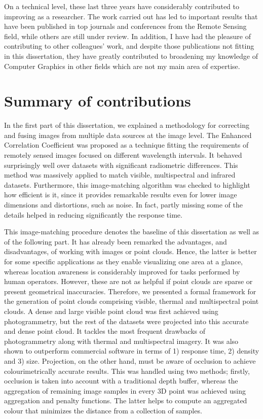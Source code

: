 On a technical level, these last three years have considerably contributed to improving as a researcher. The work carried out has led to important results that have been published in top journals and conferences from the Remote Sensing field, while others are still under review. In addition, I have had the pleasure of contributing to other colleagues' work, and despite those publications not fitting in this dissertation, they have greatly contributed to broadening my knowledge of Computer Graphics in other fields which are not my main area of expertise. 

\section{Summary of contributions}

In the first part of this dissertation, we explained a methodology for correcting and fusing images from multiple data sources at the image level. The Enhanced Correlation Coefficient was proposed as a technique fitting the requirements of remotely sensed images focused on different wavelength intervals. It behaved surprisingly well over datasets with significant radiometric differences. This method was massively applied to match visible, multispectral and infrared datasets. Furthermore, this image-matching algorithm was checked to highlight how efficient is it, since it provides remarkable results even for lower image dimensions and distortions, such as noise. In fact, partly missing some of the details helped in reducing significantly the response time.

This image-matching procedure denotes the baseline of this dissertation as well as of the following part. It has already been remarked the advantages, and disadvantages, of working with images or point clouds. Hence, the latter is better for some specific applications as they enable visualizing one area at a glance, whereas location awareness is considerably improved for tasks performed by human operators. However, these are not as helpful if point clouds are sparse or present geometrical inaccuracies. Therefore, we presented a formal framework for the generation of point clouds comprising visible, thermal and multispectral point clouds. A dense and large visible point cloud was first achieved using photogrammetry, but the rest of the datasets were projected into this accurate and dense point cloud. It tackles the most frequent drawbacks of photogrammetry along with thermal and multispectral imagery. It was also shown to outperform commercial software in terms of 1) response time, 2) density and 3) size. Projection, on the other hand, must be aware of occlusion to achieve colourimetrically accurate results. This was handled using two methods; firstly, occlusion is taken into account with a traditional depth buffer, whereas the aggregation of remaining image samples in every 3D point was achieved using aggregation and penalty functions. The latter helps to compute an aggregated colour that minimizes the distance from a collection of samples. 

